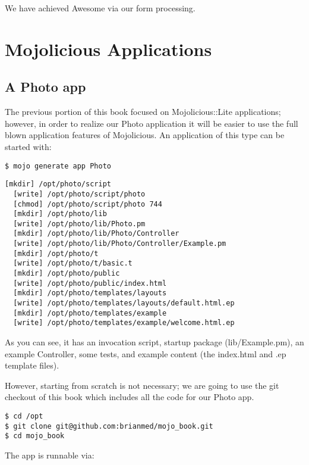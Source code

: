 \documentclass[14pt]{extreport}
\begin{document}
We have achieved Awesome via our form processing.

\chapter*{Mojolicious Applications}

\section{A Photo app}

The previous portion of this book focused on Mojolicious::Lite applications;
however, in order to realize our Photo application it will be easier to use the
full blown application features of Mojolicious.  An application of this type
can be started with:

\begin{lstlisting}[style=BashInputStyle]
$ mojo generate app Photo           
\end{lstlisting}

\begin{lstlisting}[style=BashOutputStyle]
  [mkdir] /opt/photo/script
  [write] /opt/photo/script/photo
  [chmod] /opt/photo/script/photo 744
  [mkdir] /opt/photo/lib
  [write] /opt/photo/lib/Photo.pm
  [mkdir] /opt/photo/lib/Photo/Controller
  [write] /opt/photo/lib/Photo/Controller/Example.pm
  [mkdir] /opt/photo/t
  [write] /opt/photo/t/basic.t
  [mkdir] /opt/photo/public
  [write] /opt/photo/public/index.html
  [mkdir] /opt/photo/templates/layouts
  [write] /opt/photo/templates/layouts/default.html.ep
  [mkdir] /opt/photo/templates/example
  [write] /opt/photo/templates/example/welcome.html.ep
\end{lstlisting}

As you can see, it has an invocation script, startup package (lib/Example.pm),
an example Controller, some tests, and example content (the index.html and .ep
template files).

However, starting from scratch is not necessary; we are going to use the git
checkout of this book which includes all the code for our Photo app.

\begin{lstlisting}[style=BashOutputStyle]
$ cd /opt
$ git clone git@github.com:brianmed/mojo_book.git
$ cd mojo_book
\end{lstlisting}

The app is runnable via:
\end{document}
